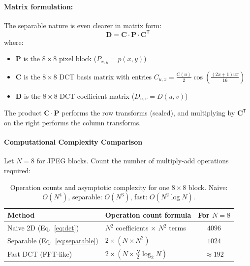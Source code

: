 \paragraph{Matrix formulation:}

The separable nature is even clearer in matrix form:
\begin{equation}
  \mathbf{D} = \mathbf{C} \cdot \mathbf{P} \cdot \mathbf{C}^{\mathsf{T}}
\end{equation}
where:
\begin{itemize}[nosep]
    \item $\mathbf{P}$ is the $8\times8$ pixel block ($P_{x,y} = p(x,y)$)
    \item $\mathbf{C}$ is the $8\times8$ DCT basis matrix with entries $C_{u,x} = \frac{C(u)}{2}\cos\!\left(\frac{(2x+1)u\pi}{16}\right)$
    \item $\mathbf{D}$ is the $8\times8$ DCT coefficient matrix ($D_{u,v} = D(u,v)$)
\end{itemize}
The product $\mathbf{C} \cdot \mathbf{P}$ performs the row transforms (scaled), and multiplying by $\mathbf{C}^{\mathsf{T}}$ on the right performs the column transforms.

\paragraph{Computational Complexity Comparison}

Let $N=8$ for JPEG blocks. Count the number of multiply-add operations required:

\begin{table}[h]
\centering
\begin{tabular}{|l|l|c|}
\hline
\textbf{Method} & \textbf{Operation count formula} & \textbf{For $N=8$} \\ \hline
Naive 2D (Eq.~\ref{eq:dct}) & $N^2$ coefficients $\times$ $N^2$ terms & $4096$ \\ \hline
Separable (Eq.~\ref{eq:separable}) & $2 \times (N \times N^2)$ & $1024$ \\ \hline
Fast DCT (FFT-like) & $2 \times (N \times \frac{N}{2}\log_2 N)$ & $\approx 192$ \\ \hline
\end{tabular}
\caption{Operation counts and asymptotic complexity for one $8\times8$ block. Naive: $O(N^4)$, separable: $O(N^3)$, fast: $O(N^2\log N)$.}
\label{tab:complexity}
\end{table}



